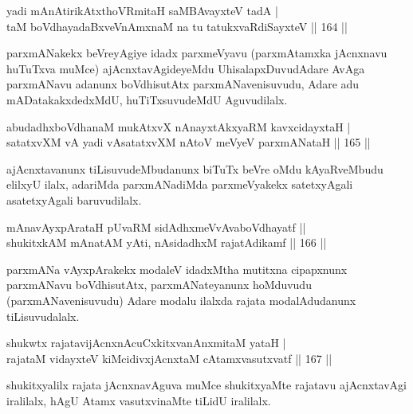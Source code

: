
\begin{shl}
yadi mAnAtirikAtxthoVR\s mitaH saMBAvayxteV tadA | \\
taM boVdhayadaBxveVnAmxnaM na tu tatukxvaRdiSayxteV \hfill||  164 ||  
\end{shl}

\begin{artha}
parxmANakekx beVreyAgiye idadx parxmeVyavu (parxmAtamxka jAcnxnavu huTuTxva muMce) ajAcnxtavAgideyeMdu UhisalapxDuvudAdare AvAga parxmANavu adanunx boVdhisutAtx parxmANavenisuvudu, Adare adu mADatakakxdedxMdU, huTiTxsuvudeMdU Aguvudilalx.
\end{artha}

\begin{shl}
abudadhxboVdhanaM mukAtxvX nAnayxtAkxyaRM kavxcidayxtaH | \\
satatxvXM vA yadi vA\s satatxvXM nAtoV meVyeV parxmANataH \hfill||  165 ||  
\end{shl}

\begin{artha}
ajAcnxtavanunx tiLisuvudeMbudanunx biTuTx beVre oMdu kAyaRveMbudu elilxyU ilalx, adariMda parxmANadiMda parxmeVyakekx satetxyAgali asatetxyAgali baruvudilalx.
\end{artha}

\begin{shl}
mAnavAyxpArataH pUvaRM sidAdhxmeVvAvaboVdhayatf ||  \\
shukitxkAM mAnatAM yAti, nAsidadhxM rajatAdikamf \hfill||  166 ||  
\end{shl}

\begin{artha}
parxmANa vAyxpArakekx modaleV idadxMtha mutitxna cipapxnunx parxmANavu boVdhisutAtx, parxmANateyanunx hoMduvudu (parxmANavenisuvudu) Adare modalu ilalxda rajata modalAdudanunx tiLisuvudalalx.
\end{artha}


\begin{shl}
shukwtx rajatavijAcnxnAcuCxkitxvanAnxmitaM yataH | \\
rajataM vidayxteV kiMcidivxjAcnxtaM cA\s \s tamxvasutxvatf \hfill||  167 ||  
\end{shl}

\begin{artha}
shukitxyalilx rajata jAcnxnavAguva muMce shukitxyaMte rajatavu ajAcnxtavAgi iralilalx, hAgU Atamx vasutxvinaMte tiLidU iralilalx.
\end{artha}

